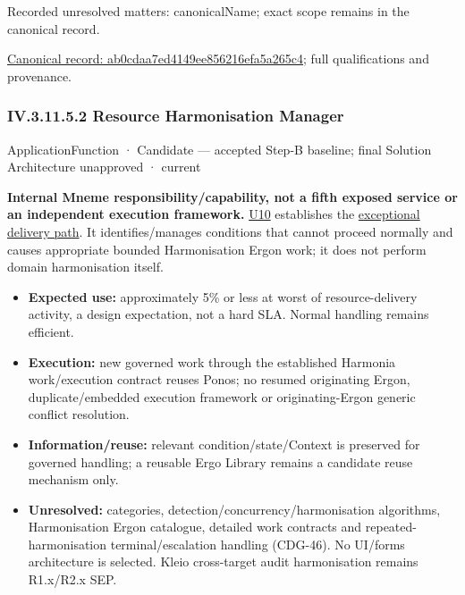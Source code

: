 {\small Recorded unresolved matters: canonicalName; exact scope remains in the canonical record.}\par
{\footnotesize \href{../../../../continuum/application/application-function/ab0cdaa7ed4149ee856216efa5a265c4.md}{Canonical record: ab0cdaa7ed4149ee856216efa5a265c4}; full qualifications and provenance.}\par
\subsubsection*{IV.3.11.5.2 Resource Harmonisation Manager}
\label{navigation:IV.3.11.5.2}

\label{element:a6580e0b9f0f40c9a33d731d20110057}
{\small ApplicationFunction · Candidate — accepted Step-B baseline; final Solution Architecture unapproved · current}\par

\textbf{Internal Mneme responsibility/capability, not a fifth exposed service or an
independent execution framework.} \href{\detokenize{../../../../../docs/markdown/05-information-systems-architecture/sources.md#u10}}{U10} establishes the
\hyperref[element:a6580e0b9f0f40c9a33d731d20110057]{exceptional delivery path}.
It identifies/manages conditions that cannot proceed normally and causes appropriate
bounded Harmonisation Ergon work; it does not perform domain harmonisation itself.



\begin{itemize}


\item \textbf{Expected use:} approximately 5\% or less at worst of resource-delivery activity,
  a design expectation, not a hard SLA. Normal handling remains efficient.

\item \textbf{Execution:} new governed work through the established Harmonia work/execution
  contract reuses Ponos; no resumed originating Ergon, duplicate/embedded execution
  framework or originating-Ergon generic conflict resolution.

\item \textbf{Information/reuse:} relevant condition/state/Context is preserved for governed
  handling; a reusable Ergo Library remains a candidate reuse mechanism only.

\item \textbf{Unresolved:} categories, detection/concurrency/harmonisation algorithms,
  Harmonisation Ergon catalogue, detailed work contracts and repeated-harmonisation
  terminal/escalation handling (CDG-46). No UI/forms architecture is selected.
  Kleio cross-target audit harmonisation remains R1.x/R2.x SEP.

\end{itemize}

